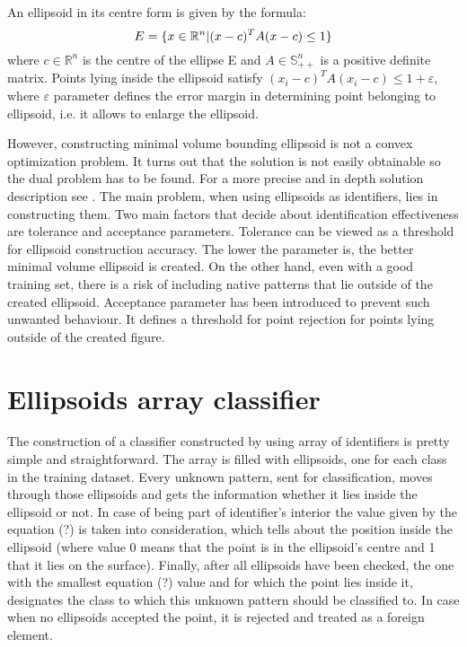 An ellipsoid in its centre form is given by the formula:
\vspace{-6pt} 
\[ 
\vspace{-3pt}
E = \{x \in \mathbb{R}^{n} | (x - c)^{T}A(x-c) \le 1\} 
\vspace{-3pt}
\] 
where $c \in \mathbb{R}^{n}$ is the centre of the ellipse E and $ A \in \mathbb{S}^{n}_{++}$ is a positive definite matrix. Points lying inside the ellipsoid satisfy $(x_{i} - c)^{T}A(x_{i} - c) \le 1 + \varepsilon$, where $\varepsilon$ parameter defines the error margin in determining point belonging to ellipsoid, i.e. it allows to enlarge the ellipsoid.%

However, constructing minimal volume bounding ellipsoid is not a convex optimization problem. It turns out that the solution is not easily obtainable so the dual problem has to be found. For a more precise and in depth solution description see \cite{MVEEMichaelTodd2005}. The main problem, when using ellipsoids as identifiers, lies in constructing them. Two main factors that decide about identification effectiveness are tolerance and acceptance parameters. Tolerance can be viewed as a threshold for ellipsoid construction accuracy. The lower the parameter is, the better minimal volume ellipsoid is created. On the other hand, even with a good training set, there is a risk of including native patterns that lie outside of the created ellipsoid. Acceptance parameter has been introduced to prevent such unwanted behaviour. It defines a threshold for point rejection for points lying outside of the created figure.

\section{Ellipsoids array classifier}

The construction of a classifier constructed by using array of identifiers is pretty simple and straightforward. The array is filled with ellipsoids, one for each class in the training dataset. Every unknown pattern, sent for classification, moves through those ellipsoids and gets the information whether it lies inside the ellipsoid or not. In case of being part of identifier's interior the value given by the equation (?) is taken into consideration, which tells about the position inside the ellipsoid (where value 0 means that the point is in the ellipsoid's centre and 1 that it lies on the surface). Finally, after all ellipsoids have been checked, the one with the smallest equation (?) value and for which the point lies inside it, designates the class to which this unknown pattern should be classified to. In case when no ellipsoids accepted the point, it is rejected and treated as a foreign element.

